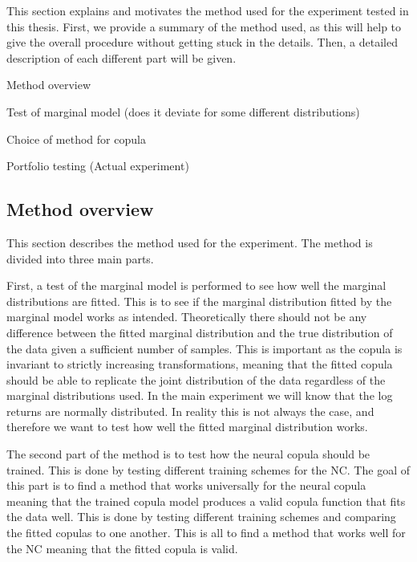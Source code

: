 This section explains and motivates the method used for the experiment tested in this thesis. First, we provide a summary of the method used, as this will help to give the overall procedure without getting stuck in the details. Then, a detailed description of each different part will be given. 


\begin{generalinstructions}
    \begin{compactenum}
        \item Method overview
        \item Test of marginal model (does it deviate for some different distributions)
        \item Choice of method for copula
        \item Portfolio testing (Actual experiment)
    \end{compactenum}
\end{generalinstructions}



\subsection{Method overview}
This section describes the method used for the experiment. The method is divided into three main parts. 

First, a test of the marginal model is performed to see how well the marginal distributions are fitted. This is to see if the marginal distribution fitted by the marginal model works as intended. Theoretically there should not be any difference between the fitted marginal distribution and the true distribution of the data  given a sufficient number of samples. This is important as the copula is invariant to strictly increasing transformations, meaning that the fitted copula should be able to replicate the joint distribution of the data regardless of the marginal distributions used. In the main experiment we will know that the log returns are normally distributed. In reality this is not always the case, and therefore we want to test how well the fitted marginal distribution works.

The second part of the method is to test how the neural copula should be trained. This is done by testing different training schemes for the \gls{NC}. The goal of this part is to find a method that works universally for the neural copula meaning that the trained copula model produces a valid copula function that fits the data well. This is done by testing different training schemes and comparing the fitted copulas to one another. This is all to find a method that works well for the \gls{NC} meaning that the fitted copula is valid. 

